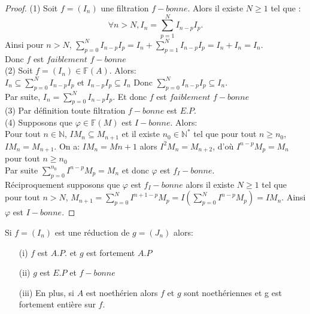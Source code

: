 \begin{proof}
	(1) Soit $f=(I_n)$ une filtration $f-bonne$. Alors il existe $N \geqslant 1$ tel que :
	\[ \forall n > N, I_n = \sum\limits_{p=1}^{N} I_{n-p}I_p. \]
	Ainsi pour $n> N$, $\sum\limits_{p=0}^{N} I_{n-p}I_p =  I_n + \sum\limits_{p=1}^{N} I_{n-p}I_p = I_n + I_n = I_n$. \\
	Donc $f$ est $faiblement$ $f-bonne$ \\
	(2) Soit $f=(I_n) \in \mathbb{F}(A)$. Alors:\\
	$I_n \subseteq \sum\limits_{p=0}^{N} I_{n-p}I_p$ et $ I_{n-p}I_p \subseteq I_n$
	Donc $\sum\limits_{p=0}^{N}I_{n-p}I_p \subseteq I_n$. \\ Par suite, $I_n = \sum\limits_{p=0}^{N} I_{n-p}I_p.$ Et donc $f$ est $faiblement$ $f-bonne$ \\
	(3) Par définition toute filtration $f-bonne$ est $E.P$. \\
	(4) Supposons que $\varphi \in \mathbb{F}(M)$ est $I-bonne$. Alors: \\
	Pour tout $n \in \mathbb{N}$, $IM_n \subseteq M_{n+1}$ et il existe $n_0 \in \mathbb{N}^{*}$ tel que pour tout $n \geqslant n_0$, $IM_n = M_{n+1}$.
	On a: $IM_n=M{n+1}$ alors $I^{2}M_n=M_{n+2}$, d'où $I^{n-p}M_p=M_n$ pour tout $n \geqslant n_0$\\ Par suite $\sum\limits_{p=0}^{n_0}I^{n-p}M_p=M_n$ et donc $\varphi$ est $f_{I}-bonne$. \\
	Réciproquement supposons que $\varphi$ est $f_{I}-bonne$ alors il existe $N \geqslant 1$ tel que pour tout $n> N$, $M_{n+1} = \sum\limits_{p=0}^{N}I^{n+1-p}M_p =I(\sum\limits_{p=0}^{N}I^{n-p}M_p ) = IM_n$. Ainsi $\varphi$ est $I-bonne$.	
	
\end{proof}
\begin{maproposition}
	Si $f=(I_n)$ est une réduction de $g=(J_n)$ alors:
	\begin{enumerate}
		\item[(i)] $f$ est $A.P.$ et $g$ est fortement $A.P$
		\item[(ii)] $g$ est $E.P$ et $f-bonne$
		\item[(iii)] En plus, si $A$ est noethérien alors $f$ et $g$ sont noethériennes et g est fortement entière sur $f$.
	\end{enumerate}
\end{maproposition}
